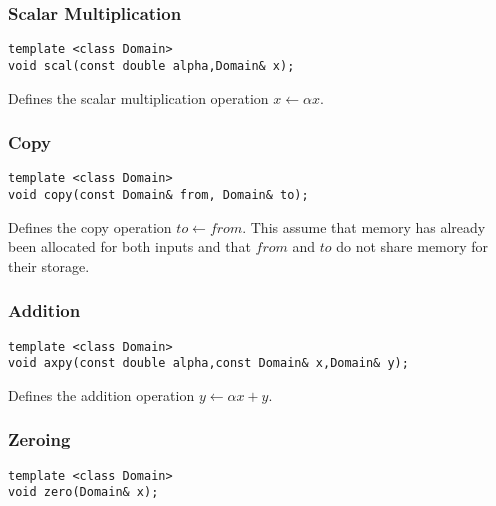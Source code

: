 \documentclass{article}
\begin{document}
\subsubsection{Scalar Multiplication}

\begin{flushleft}
\begin{lstlisting}
template <class Domain>
void scal(const double alpha,Domain& x);
\end{lstlisting}
\end{flushleft}

Defines the scalar multiplication operation $x\leftarrow \alpha x$. 

\subsubsection{Copy}

\begin{flushleft}
\begin{lstlisting}
template <class Domain>
void copy(const Domain& from, Domain& to);
\end{lstlisting}
\end{flushleft}

Defines the copy operation $to \leftarrow from$.  This assume that memory has already been allocated for both inputs and that $from$ and $to$ do not share memory for their storage.

\subsubsection{Addition}

\begin{flushleft}
\begin{lstlisting}
template <class Domain>
void axpy(const double alpha,const Domain& x,Domain& y);
\end{lstlisting}
\end{flushleft}

Defines the addition operation $y\leftarrow \alpha x+y$.

\subsubsection{Zeroing}

\begin{flushleft}
\begin{lstlisting}
template <class Domain>
void zero(Domain& x);
\end{lstlisting}
\end{flushleft}
\end{document}
